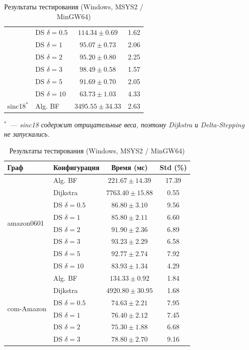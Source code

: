 \documentclass[a4paper]{article}
\begin{document}
\begin{table}[h!]
\begin{minipage}{0.48\textwidth}
\begin{tabular}{llcc}
    & DS $\delta=0.5$ & $114.34 \pm 0.69$ & 1.62 \\
    & DS $\delta=1$ & $95.07 \pm 0.73$ & 2.06 \\
    & DS $\delta=2$ & $95.20 \pm 0.80$ & 2.25 \\
    & DS $\delta=3$ & $98.49 \pm 0.58$ & 1.57 \\
    & DS $\delta=5$ & $91.69 \pm 0.70$ & 2.05 \\
    & DS $\delta=10$ & $63.73 \pm 1.03$ & 4.33 \\
\midrule
\multirow{1}{*}{sinc18$^*$}
    & Alg. BF & $3495.55 \pm 34.33$ & 2.63 \\
\bottomrule
\end{tabular}
\smallskip

\noindent\emph{$^*$~--- sinc18 содержит отрицательные веса, поэтому Dijkstra и Delta-Stepping не запускались.}
\end{minipage}
\hfill
\begin{minipage}{0.48\textwidth}
\centering
\footnotesize
\caption{Результаты тестирования (Windows, MSYS2 / MinGW64)}
\label{tab:bench-win}
\begin{tabular}{llcc}
\toprule
\textbf{Граф} & \textbf{Конфигурация} & \textbf{Время (мс)} & \textbf{Std (\%)} \\
\midrule
\multirow{8}{*}{amazon0601}
    & Alg. BF & $221.67 \pm 14.39$ & 17.39 \\
    & Dijkstra & $7763.40 \pm 15.88$ & 0.55 \\
    & DS $\delta=0.5$ & $86.80 \pm 3.10$ & 9.56 \\
    & DS $\delta=1$ & $85.80 \pm 2.11$ & 6.60 \\
    & DS $\delta=2$ & $91.90 \pm 2.36$ & 6.89 \\
    & DS $\delta=3$ & $93.23 \pm 2.29$ & 6.58 \\
    & DS $\delta=5$ & $92.77 \pm 2.74$ & 7.92 \\
    & DS $\delta=10$ & $83.93 \pm 1.34$ & 4.29 \\
\midrule
\multirow{8}{*}{com-Amazon}
    & Alg. BF & $134.33 \pm 0.92$ & 1.84 \\
    & Dijkstra & $4920.80 \pm 30.95$ & 1.68 \\
    & DS $\delta=0.5$ & $74.63 \pm 2.21$ & 7.95 \\
    & DS $\delta=1$ & $76.40 \pm 2.12$ & 7.45 \\
    & DS $\delta=2$ & $75.30 \pm 1.88$ & 6.68 \\
    & DS $\delta=3$ & $78.80 \pm 2.70$ & 9.16 \\

\end{tabular}
\end{minipage}
\end{table}
\end{document}
